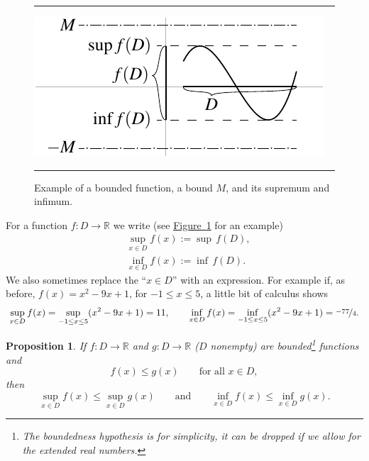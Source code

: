 \documentclass[12pt]{book}
\newenvironment{myfigureht}{%
\begin{figure}[h!t]
\noindent\rule{\textwidth}{0.4pt}\vspace{12pt}\par\centering}%
{\par\noindent\rule{\textwidth}{0.4pt}
\end{figure}}
\newcommand{\R}{{\mathbb{R}}}
\theoremstyle{plain}
\newtheorem{prop}[thm]{Proposition}
\theoremstyle{remark}
\theoremstyle{definition}
\theoremstyle{exercise}
\theoremstyle{example}
\newcommand{\figureref}[1]{\hyperref[#1]{Figure~\ref*{#1}}}
\begin{document}
\begin{myfigureht}
\includegraphics{figures/boundedfunc}
\caption{Example of a bounded function, a bound $M$, and its supremum and infimum.\label{boundedfuncfig}}
\end{myfigureht}
For a function $f \colon D \to \R$ we write (see \figureref{boundedfuncfig} for
an example)
\begin{align*}
& \sup_{x \in D} f(x) := \sup\, f(D) , \\
& \inf_{x \in D} f(x) := \inf\, f(D) .
\end{align*}
We also sometimes replace the ``$x \in D$'' with an expression.
For example if, as before, $f(x) = x^2-9x+1$, for $-1 \leq x \leq 5$, 
a little bit of calculus shows
\begin{equation*}
\sup_{x \in D} f(x) = 
\sup_{-1 \leq x \leq 5} ( x^2 -9x+1 ) = 11,
\qquad
\inf_{x \in D} f(x) = 
\inf_{-1 \leq x \leq 5} ( x^2 -9x+1 ) = \nicefrac{-77}{4} .
\end{equation*}



\begin{prop} \label{prop:funcsupinf}
If $f \colon D \to \R$ and $g \colon D \to \R$ ($D$ nonempty) are
bounded\footnote{The boundedness hypothesis is for simplicity,
it can be dropped if we allow for the extended real numbers.}
functions and
\begin{equation*}
f(x) \leq g(x) \qquad \text{for all $x \in D$},
\end{equation*}
then
\begin{equation} \label{prop:funcsupinf:eq}
\sup_{x \in D} f(x) \leq \sup_{x \in D} g(x)
\qquad \text{and} \qquad
\inf_{x \in D} f(x) \leq \inf_{x \in D} g(x) .
\end{equation}
\end{prop}
\end{document}

